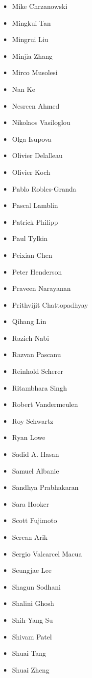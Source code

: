\begin{multicols}{4}
\begin{itemize}[label={}]
    \item Mike Chrzanowski
    \item Mingkui Tan
    \item Mingrui Liu
    \item Minjia Zhang
    \item Mirco Musolesi
    \item Nan Ke
    \item Nesreen Ahmed
    \item Nikolaos Vasiloglou
    \item Olga Isupova
    \item Olivier Delalleau
    \item Olivier Koch
    \item Pablo Robles-Granda
    \item Pascal Lamblin
    \item Patrick Philipp
    \item Paul Tylkin
    \item Peixian Chen
    \item Peter Henderson
    \item Praveen Narayanan
    \item Prithvijit Chattopadhyay
    \item Qihang Lin
    \item Razieh Nabi
    \item Razvan Pascanu
    \item Reinhold Scherer
    \item Ritambhara Singh
    \item Robert Vandermeulen
    \item Roy Schwartz
    \item Ryan Lowe
    \item Sadid A. Hasan
    \item Samuel Albanie
    \item Sandhya Prabhakaran
    \item Sara Hooker
    \item Scott Fujimoto
    \item Sercan Arik
    \item Sergio Valcarcel Macua
    \item Seungjae Lee
    \item Shagun Sodhani
    \item Shalini Ghosh
    \item Shih-Yang Su
    \item Shivam Patel
    \item Shuai Tang
    \item Shuai Zheng

\end{itemize}
\end{multicols}
